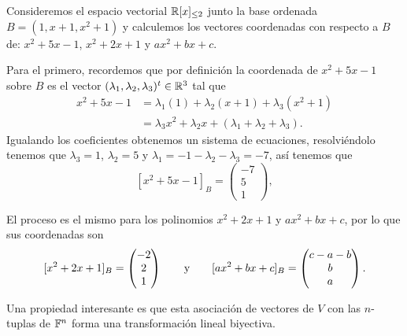 \begin{example}
  Consideremos el espacio vectorial $\mathbb{R}[x]_{\leq 2}$ junto la base ordenada $B = (1, x+1, x^2+1)$ y calculemos los vectores coordenadas con respecto a $B$ de: $x^2+5x-1$, $x^2 + 2x+1$ y $ax^2 + bx + c$.

  \examplesolution 

  Para el primero, recordemos que por definición la coordenada de $x^2+5x-1$ sobre $B$ es el vector $(\lambda_1, \lambda_2, \lambda_3)^t \in \mathbb{R}^3$ tal que
    \begin{align*}
      x^2+5x-1 &= \lambda_1 (1) + \lambda_2(x+1) + \lambda_3(x^2+1) \\
        &= \lambda_3 x^2 + \lambda_2x + (\lambda_1 + \lambda_2 + \lambda_3).
    \end{align*}  
    Igualando los coeficientes obtenemos un sistema de ecuaciones, resolviéndolo tenemos que $\lambda_3 = 1$, $\lambda_2 = 5$ y $\lambda_1 = -1 - \lambda_2 - \lambda_3 = -7$, así tenemos que
      \[
        [x^2+5x-1]_B = \begin{pmatrix} -7 \\ 5 \\ 1 \end{pmatrix},
      \]
    
    El proceso es el mismo para los polinomios $x^2 + 2x+1$ y $ax^2 + bx + c$, por lo que sus coordenadas son
    \[
        [x^2+2x+1]_B = \begin{pmatrix} -2 \\ 2 \\ 1 \end{pmatrix}
          \qquad\text{y}\qquad
        [ax^2+bx+c]_B = \begin{pmatrix} c-a-b \\b \\ a \end{pmatrix}.
      \]
\end{example}

Una propiedad interesante es que esta asociación de vectores de $V$ con las $n$-tuplas de $\mathbb{F}^n$ forma una transformación lineal biyectiva.

